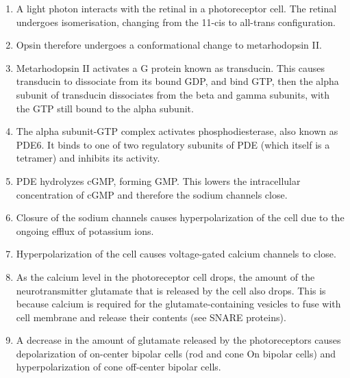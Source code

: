 \begin{enumerate}
\def\labelenumi{\arabic{enumi}.}
\tightlist
\item
  A light photon interacts with the retinal in a photoreceptor cell. The retinal undergoes isomerisation, changing from the 11-cis to all-trans configuration.
\item
  Opsin therefore undergoes a conformational change to metarhodopsin II.
\item
  Metarhodopsin II activates a G protein known as transducin. This causes transducin to dissociate from its bound GDP, and bind GTP, then the alpha subunit of transducin dissociates from the beta and gamma subunits, with the GTP still bound to the alpha subunit.
\item
  The alpha subunit-GTP complex activates phosphodiesterase, also known as PDE6. It binds to one of two regulatory subunits of PDE (which itself is a tetramer) and inhibits its activity.
\item
  PDE hydrolyzes cGMP, forming GMP. This lowers the intracellular concentration of cGMP and therefore the sodium channels close.
\item
  Closure of the sodium channels causes hyperpolarization of the cell due to the ongoing efflux of potassium ions.
\item
  Hyperpolarization of the cell causes voltage-gated calcium channels to close.
\item
  As the calcium level in the photoreceptor cell drops, the amount of the neurotransmitter glutamate that is released by the cell also drops. This is because calcium is required for the glutamate-containing vesicles to fuse with cell membrane and release their contents (see SNARE proteins).
\item
  A decrease in the amount of glutamate released by the photoreceptors causes depolarization of on-center bipolar cells (rod and cone On bipolar cells) and hyperpolarization of cone off-center bipolar cells.
\end{enumerate}




